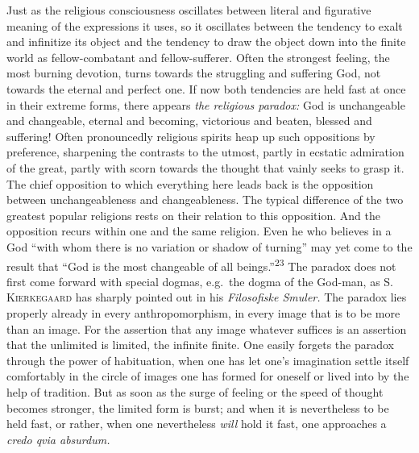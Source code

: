 \documentclass[12pt,a4paper]{book}
\newcommand{\opage}[1]{\marginnote{\footnotesize\textit{[#1]}}}
\begin{document}
Just as the religious consciousness oscillates between literal and figurative
meaning of the expressions it uses, so it oscillates between the tendency to
exalt and infinitize its object and the tendency to draw the object down into
the finite world as fellow-combatant and fellow-sufferer. Often the 
\opage{48}strongest
feeling, the most burning devotion, turns towards the struggling and suffering
God, not towards the eternal and perfect one. If now both tendencies are held
fast at once in their extreme forms, there appears \emph{the religious
paradox:} God is unchangeable and changeable, eternal and becoming,
victorious and beaten, blessed and suffering! Often pronouncedly religious
spirits heap up such oppositions by preference, sharpening the contrasts to
the utmost, partly in ecstatic admiration of the great, partly with scorn
towards the thought that vainly seeks to grasp it. The chief opposition to
which everything here leads back is the opposition between unchangeableness
and changeableness. The typical difference of the two greatest popular
religions rests on their relation to this opposition. And the opposition
recurs within one and the same religion. Even he who believes in a God ``with
whom there is no variation or shadow of turning'' may yet come to the result
that ``God is the most changeable of all beings.''\textsuperscript{23} The
paradox does not first come forward with special dogmas, e.g.\ the dogma of
the God-man, as \textsc{S. Kierkegaard} has sharply pointed out in his
\emph{Filosofiske Smuler.} The paradox lies properly already in every
anthropomorphism, in every image that is to be more than an image. For the
assertion that any image whatever suffices is an assertion that the unlimited
is limited, the infinite finite. One easily forgets the paradox through the
power of habituation, when one has let one's imagination settle itself
comfortably in the circle of images one has formed for oneself or lived into
by the help of tradition. But as soon as the surge of feeling or the speed of
thought becomes stronger, the limited form is burst; and when it is
nevertheless to be held fast, or rather, when one nevertheless \emph{will}
hold it fast, one approaches a \emph{credo qvia absurdum.}

\medskip
\end{document}
